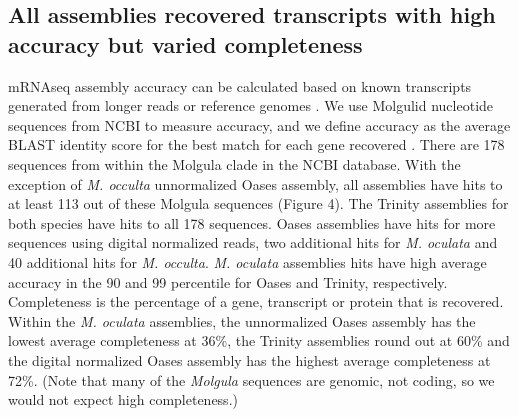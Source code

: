 \subsection{All assemblies recovered transcripts with high accuracy but varied completeness}
mRNAseq assembly accuracy can be calculated based on known transcripts generated from longer reads or reference genomes \citep{vijay_challenges_2012,martin_next-generation_2011}. We use Molgulid nucleotide sequences from NCBI to measure accuracy, and we define accuracy as the average BLAST identity score for the best match for each gene recovered \citep{li_sequence_2009}. There are 178 sequences from within the Molgula clade in the NCBI database. With the exception of \textit{M. occulta} unnormalized Oases assembly, all assemblies have hits to at least 113 out of these Molgula sequences (Figure 4). The Trinity assemblies for both species have hits to all 178 sequences. Oases assemblies have hits for more sequences using digital normalized reads, two additional hits for \textit{M. oculata} and 40 additional hits for \textit{M. occulta}. \textit{M. oculata} assemblies hits have high average accuracy in the 90 and 99 percentile for Oases and Trinity, respectively. Completeness is the percentage of a gene, transcript or protein that is recovered. Within the \textit{M. oculata} assemblies, the unnormalized Oases assembly has the lowest average completeness at 36\%, the Trinity assemblies round out at 60\% and the digital normalized Oases assembly has the highest average completeness at 72\%.  (Note that many of the \textit{Molgula} sequences are genomic, not coding, so we would not expect high completeness.)

